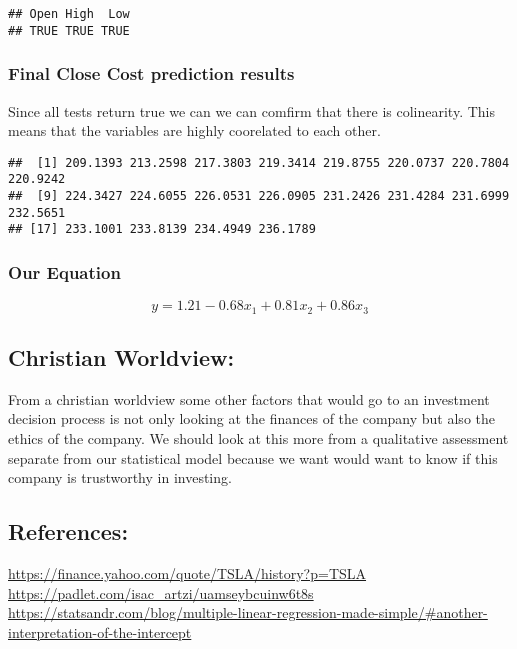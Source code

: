\documentclass[
]{article}
\newenvironment{Shaded}{\begin{snugshade}}{\end{snugshade}}
\newcommand{\AttributeTok}[1]{\textcolor[rgb]{0.77,0.63,0.00}{#1}}
\newcommand{\DecValTok}[1]{\textcolor[rgb]{0.00,0.00,0.81}{#1}}
\newcommand{\FunctionTok}[1]{\textcolor[rgb]{0.00,0.00,0.00}{#1}}
\newcommand{\NormalTok}[1]{#1}
\newcommand{\OtherTok}[1]{\textcolor[rgb]{0.56,0.35,0.01}{#1}}
\newcommand{\SpecialCharTok}[1]{\textcolor[rgb]{0.00,0.00,0.00}{#1}}
\begin{document}
\begin{verbatim}
## Open High  Low 
## TRUE TRUE TRUE
\end{verbatim}

\hypertarget{final-close-cost-prediction-results}{%
\subsubsection{Final Close Cost prediction
results}\label{final-close-cost-prediction-results}}

Since all tests return true we can we can comfirm that there is
colinearity. This means that the variables are highly coorelated to each
other.

\begin{Shaded}
\end{Shaded}

\begin{verbatim}
##  [1] 209.1393 213.2598 217.3803 219.3414 219.8755 220.0737 220.7804 220.9242
##  [9] 224.3427 224.6055 226.0531 226.0905 231.2426 231.4284 231.6999 232.5651
## [17] 233.1001 233.8139 234.4949 236.1789
\end{verbatim}

\hypertarget{our-equation}{%
\subsubsection{Our Equation}\label{our-equation}}

\[ y = 1.21 - 0.68 x_1+ 0.81 x_2 + 0.86 x_3 \]

\hypertarget{christian-worldview}{%
\subsection{Christian Worldview:}\label{christian-worldview}}

From a christian worldview some other factors that would go to an
investment decision process is not only looking at the finances of the
company but also the ethics of the company. We should look at this more
from a qualitative assessment separate from our statistical model
because we want would want to know if this company is trustworthy in
investing.

\hypertarget{references}{%
\subsection{References:}\label{references}}

\url{https://finance.yahoo.com/quote/TSLA/history?p=TSLA}
\url{https://padlet.com/isac_artzi/uamseybcuinw6t8s}
\url{https://statsandr.com/blog/multiple-linear-regression-made-simple/\#another-interpretation-of-the-intercept}
\end{document}
